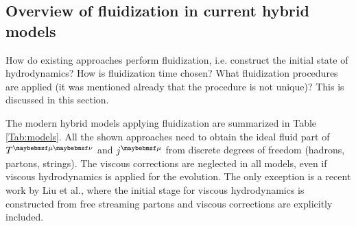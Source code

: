 \subsection{Overview of fluidization in current hybrid models} \label{Sec_II}

How do existing approaches perform fluidization, i.e. construct the initial state
of hydrodynamics? How is fluidization time chosen? What fluidization procedures
are applied (it was mentioned already that the procedure is not unique)? This is
discussed in this section.

The modern hybrid models applying fluidization are summarized in Table
\ref{Tab:models}. All the shown approaches need to obtain the ideal fluid part of
$\Tmn$ and $\jmu$ from discrete degrees of freedom (hadrons, partons, strings). The
viscous corrections are neglected in all models, even if viscous hydrodynamics is
applied for the evolution. The only exception is a recent work by Liu et
al.\cite{Liu:2015nwa}, where the initial stage for viscous hydrodynamics is
constructed from free streaming partons and viscous corrections are explicitly
included.

